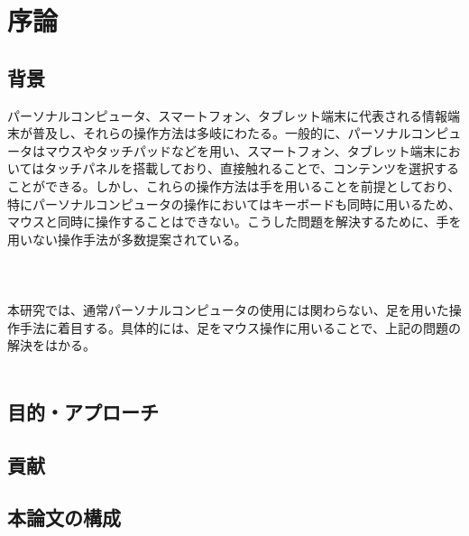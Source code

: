 \chapter{序論}

\section{背景}
パーソナルコンピュータ、スマートフォン、タブレット端末に代表される情報端末が普及し、それらの操作方法は多岐にわたる。一般的に、パーソナルコンピュータはマウスやタッチパッドなどを用い、スマートフォン、タブレット端末においてはタッチパネルを搭載しており、直接触れることで、コンテンツを選択することができる。しかし、これらの操作方法は手を用いることを前提としており、特にパーソナルコンピュータの操作においてはキーボードも同時に用いるため、マウスと同時に操作することはできない。こうした問題を解決するために、手を用いない操作手法が多数提案されている。\\
\\
\\
\\
本研究では、通常パーソナルコンピュータの使用には関わらない、足を用いた操作手法に着目する。具体的には、足をマウス操作に用いることで、上記の問題の解決をはかる。
\\
\\




\section{目的・アプローチ}


\section{貢献}
\section{本論文の構成}
